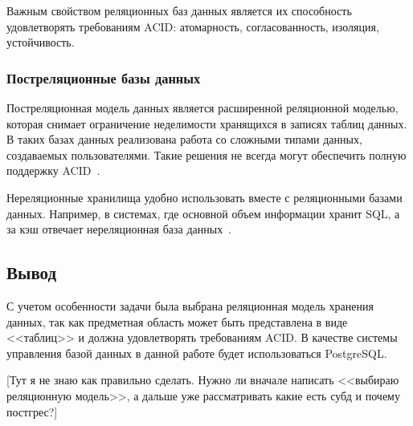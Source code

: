 Важным свойством реляционных баз данных является их способность удовлетворять требованиям ACID: атомарность, согласованность, изоляция, устойчивость.
 
\subsubsection{Постреляционные базы данных}

Постреляционная модель данных является расширенной реляционной моделью, которая снимает ограничение неделимости хранящихся в записях таблиц данных. В таких базах данных реализована работа со сложными типами данных, создаваемых пользователями. Такие решения не всегда могут обеспечить полную поддержку ACID~\cite{acid}. 

Нереляционные хранилища удобно использовать вместе с реляционными базами данных. Например, в системах, где основной объем информации хранит SQL, а за кэш отвечает нереляционная база данных~\cite{amazon}.

\subsection*{Вывод}

С учетом особенности задачи была выбрана реляционная модель хранения данных, так как предметная область может быть представлена в виде <<таблиц>> и должна удовлетворять требованиям ACID. В качестве системы управления базой данных в данной работе будет использоваться PostgreSQL.


[Тут я не знаю как правильно сделать. Нужно ли вначале написать <<выбираю реляционную модель>>,  а дальше уже рассматривать какие есть субд и почему постгрес?]
